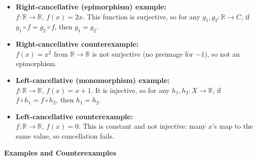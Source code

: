 \documentclass[10pt]{article}
\theoremstyle{plain}
\theoremstyle{definition}
\begin{document}
\begin{itemize}
	\item \textbf{Right-cancellative (epimorphism) example:} \\
	\( f: \mathbb{R} \to \mathbb{R} \), \( f(x) = 2x \). This function is surjective, so for any \( g_1, g_2: \mathbb{R} \to C \), if \( g_1 \circ f = g_2 \circ f \), then \( g_1 = g_2 \).
	
	\item \textbf{Right-cancellative counterexample:} \\
	\( f(x) = x^2 \) from \( \mathbb{R} \to \mathbb{R} \) is not surjective (no preimage for \( -1 \)), so not an epimorphism.
	
	\item \textbf{Left-cancellative (monomorphism) example:} \\
	\( f: \mathbb{R} \to \mathbb{R} \), \( f(x) = x + 1 \). It is injective, so for any \( h_1, h_2: X \to \mathbb{R} \), if \( f \circ h_1 = f \circ h_2 \), then \( h_1 = h_2 \).
	
	\item \textbf{Left-cancellative counterexample:} \\
	\( f: \mathbb{R} \to \mathbb{R} \), \( f(x) = 0 \). This is constant and not injective: many \( x \)'s map to the same value, so cancellation fails.
\end{itemize}


\bigskip

\textbf{Examples and Counterexamples}
\end{document}
